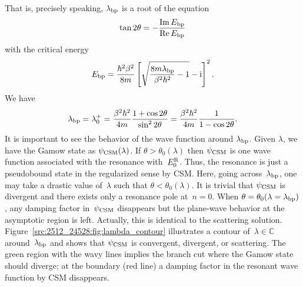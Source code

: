 That is, precisely speaking, $\lambda_{\mathrm{bp}}$ is a root of the equation
\begin{align}
    \tan2\theta = - \frac{\operatorname{Im} E_{\mathrm{bp}}}{\operatorname{Re} E_{\mathrm{bp}}}
\end{align}
with the critical energy
\begin{align}
    E_{\mathrm{bp}} = \frac{\hbar^2\beta^2}{8m} \left[\sqrt{\frac{8m\lambda_{\mathrm{bp}}}{\beta^2 \hbar^2} - 1} - \mathrm{i} \right]^2.
\end{align}
We have
\begin{align}
    \lambda_{\mathrm{bp}} = \lambda_0^+ = \frac{\beta^2 \hbar^2}{4m}\frac{1 + \cos 2\theta}{\sin^2 2\theta}    
    = \frac{\beta^2 \hbar^2}{4m}\frac{1}{1-\cos2\theta} .
\end{align}
It is important to see the behavior of the wave function around $\lambda_{\mathrm{bp}}$.
Given $\lambda$, we have the Gamow state as $\psi_{\mathrm{CSM}}(\lambda)$.
If $\theta>\theta_0(\lambda)$ then $\psi_{\mathrm{CSM}}$ is one wave function associated with the resonance with~$E^{\mathrm{R}}_0$.
Thus, the resonance is just a pseudobound state in the regularized sense by CSM.
Here, going across~$\lambda_{\mathrm{bp}}$, one may take a drastic value of~$\lambda$ such that $\theta<\theta_0(\lambda)$.
It is trivial that $\psi_{\mathrm{CSM}}$ is divergent and there exists only a resonance pole at~$n=0$.
When $\theta=\theta_0(\lambda=\lambda_{\mathrm{bp}})$, any damping factor in~$\psi_{\mathrm{CSM}}$ disappears but the plane-wave behavior at the asymptotic region is left. Actually, this is identical to the scattering solution.
Figure~\ref{src:2512_24528:fig:lambda_contour} illustrates a contour of~$\lambda\in\mathbb{C}$ around~$\lambda_{\mathrm{bp}}$ and shows that $\psi_{\mathrm{CSM}}$ is convergent, divergent, or scattering.
The green region with the wavy lines implies the branch cut where the Gamow state should diverge; at the boundary (red line) a damping factor in the resonant wave function by CSM disappears.

